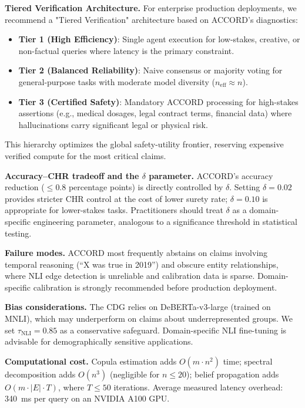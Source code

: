 \documentclass[conference]{IEEEtran}
\begin{document}
\textbf{Tiered Verification Architecture.}
For enterprise production deployments, we recommend a "Tiered Verification" architecture based on ACCORD's diagnostics:
\begin{itemize}
    \item \textbf{Tier 1 (High Efficiency)}: Single agent execution for low-stakes, creative, or non-factual queries where latency is the primary constraint.
    \item \textbf{Tier 2 (Balanced Reliability)}: Naive consensus or majority voting for general-purpose tasks with moderate model diversity ($n_\text{eff} \approx n$).
    \item \textbf{Tier 3 (Certified Safety)}: Mandatory ACCORD processing for high-stakes assertions (e.g., medical dosages, legal contract terms, financial data) where hallucinations carry significant legal or physical risk.
\end{itemize}
This hierarchy optimizes the global safety-utility frontier, reserving expensive verified compute for the most critical claims.

\textbf{Accuracy--CHR tradeoff and the $\delta$ parameter.}
ACCORD's accuracy reduction ($\leq 0.8$ percentage points)
is directly controlled by $\delta$.
Setting $\delta = 0.02$ provides stricter CHR control at the
cost of lower surety rate; $\delta = 0.10$ is appropriate for
lower-stakes tasks.
Practitioners should treat $\delta$ as a domain-specific
engineering parameter, analogous to a significance threshold
in statistical testing.

\textbf{Failure modes.}
ACCORD most frequently abstains on claims involving
temporal reasoning (``X was true in 2019'') and obscure
entity relationships, where NLI edge detection is unreliable
and calibration data is sparse.
Domain-specific calibration is strongly recommended before
production deployment.

\textbf{Bias considerations.}
The CDG relies on DeBERTa-v3-large (trained on MNLI),
which may underperform on claims about underrepresented groups.
We set $\tau_\text{NLI} = 0.85$ as a conservative safeguard.
Domain-specific NLI fine-tuning is advisable for
demographically sensitive applications.

\textbf{Computational cost.}
Copula estimation adds $O(m \cdot n^2)$ time;
spectral decomposition adds $O(n^3)$ (negligible for $n \leq 20$);
belief propagation adds $O(m \cdot |E| \cdot T)$,
where $T \leq 50$ iterations.
Average measured latency overhead: 340~ms per query on an
NVIDIA A100 GPU.
\end{document}
